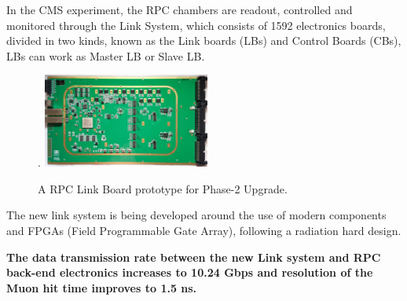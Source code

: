 




In the CMS experiment, the RPC chambers are readout, controlled and monitored through the Link System, which consists of 1592 electronics boards, divided in two kinds, known as the Link boards (LBs) and Control Boards (CBs), LBs can work as Master LB or Slave LB.  


\begin{figure}
    \caption{\footnotesize A RPC Link Board prototype for Phase-2 Upgrade.}
    \label{link_system}.
    \includegraphics[width=0.49\textwidth]{uioposter-images/link_system_board.png}
\end{figure}


The new link system is being developed around the use of modern components and FPGAs (Field Programmable Gate Array), following a radiation hard design. 

\begin{tcolorbox}[colback=gray!5,colframe=gray!40!black]
    \textbf{The data transmission rate between the new Link system and RPC back-end electronics increases to 10.24 Gbps and resolution of the Muon hit time improves to 1.5 ns.}
\end{tcolorbox}

